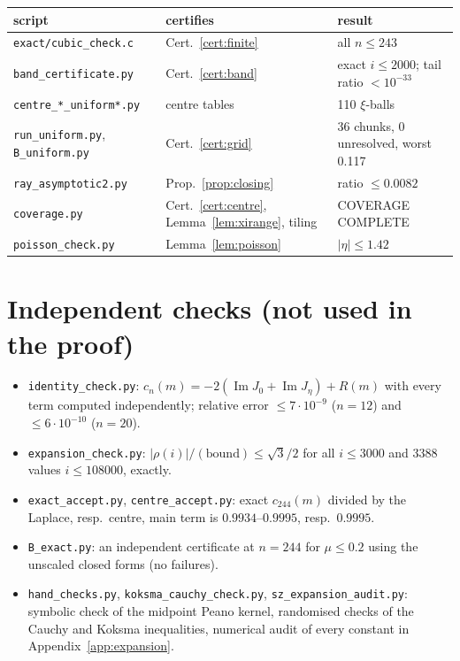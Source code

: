 \documentclass[11pt,reqno]{amsart}
\theoremstyle{plain}
\theoremstyle{definition}
\renewcommand{\Im}{\operatorname{Im}}
\begin{document}
\begin{center}\small
\begin{tabular}{lll}
\toprule
script & certifies & result\\
\midrule
\texttt{exact/cubic\_check.c} & Cert.~\ref{cert:finite} & all $n\le243$\\
\texttt{band\_certificate.py} & Cert.~\ref{cert:band} & exact $i\le2000$; tail ratio $<10^{-33}$\\
\texttt{centre\_*\_uniform*.py} & centre tables & 110 $\xi$-balls\\
\texttt{run\_uniform.py}, \texttt{B\_uniform.py} & Cert.~\ref{cert:grid} & 36 chunks, 0 unresolved, worst 0.117\\
\texttt{ray\_asymptotic2.py} & Prop.~\ref{prop:closing} & ratio $\le0.0082$\\
\texttt{coverage.py} & Cert.~\ref{cert:centre}, Lemma~\ref{lem:xirange}, tiling & COVERAGE COMPLETE\\
\texttt{poisson\_check.py} & Lemma~\ref{lem:poisson} & $|\eta|\le1.42$\\
\bottomrule
\end{tabular}
\end{center}

\section{Independent checks (not used in the proof)}\label{sec:checks}
\begin{itemize}
\item \texttt{identity\_check.py}: $c_n(m)=-2(\Im J_0+\Im J_\eta)+R(m)$ with every term computed independently; relative error $\le7\cdot10^{-9}$ ($n=12$)
and $\le6\cdot10^{-10}$ ($n=20$).
\item \texttt{expansion\_check.py}: $|\rho(i)|/(\text{bound})\le\sqrt3/2$ for all $i\le3000$ and $3388$ values $i\le108000$, exactly.
\item \texttt{exact\_accept.py}, \texttt{centre\_accept.py}: exact $c_{244}(m)$ divided by the Laplace, resp.\ centre, main term is
$0.9934$--$0.9995$, resp.\ $0.9995$.
\item \texttt{B\_exact.py}: an independent certificate at $n=244$ for $\mu\le0.2$ using the unscaled closed forms (no failures).
\item \texttt{hand\_checks.py}, \texttt{koksma\_cauchy\_check.py}, \texttt{sz\_expansion\_audit.py}: symbolic check of the midpoint Peano kernel,
randomised checks of the Cauchy and Koksma inequalities, numerical audit of every constant in Appendix~\ref{app:expansion}.
\end{itemize}
\end{document}
